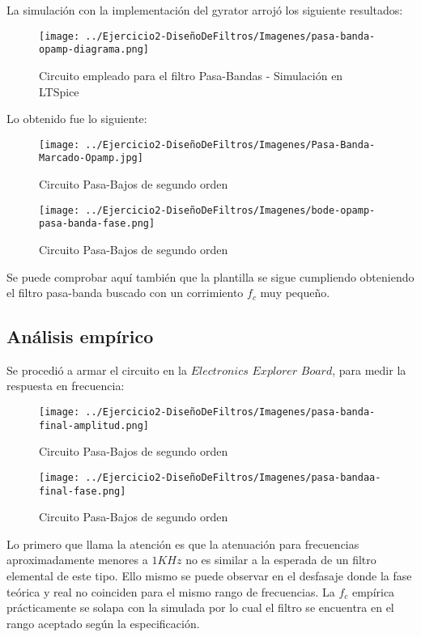 La simulación con la implementación del gyrator arrojó los siguiente resultados:

\begin{figure}[H]
    \centering
    \texttt{[image: ../Ejercicio2-DiseñoDeFiltros/Imagenes/pasa-banda-opamp-diagrama.png]}
    \caption{Circuito empleado para el filtro Pasa-Bandas - Simulación en LTSpice}
\end{figure}

Lo obtenido fue lo siguiente:

\begin{figure}[H]
    \centering
    \texttt{[image: ../Ejercicio2-DiseñoDeFiltros/Imagenes/Pasa-Banda-Marcado-Opamp.jpg]}
    \caption{Circuito Pasa-Bajos de segundo orden}
\end{figure}

\begin{figure}[H]
    \centering
    \texttt{[image: ../Ejercicio2-DiseñoDeFiltros/Imagenes/bode-opamp-pasa-banda-fase.png]}
    \caption{Circuito Pasa-Bajos de segundo orden}
\end{figure}

Se puede comprobar aquí también que la plantilla se sigue cumpliendo obteniendo el filtro pasa-banda buscado con un corrimiento
$f_c$ muy pequeño.

\subsection{Análisis empírico}

Se procedió a armar el circuito en la $Electronics$ $Explorer$ $Board$, para medir la respuesta en frecuencia:

\begin{figure}[H]
    \centering
    \texttt{[image: ../Ejercicio2-DiseñoDeFiltros/Imagenes/pasa-banda-final-amplitud.png]}
    \caption{Circuito Pasa-Bajos de segundo orden}
\end{figure}

\begin{figure}[H]
    \centering
    \texttt{[image: ../Ejercicio2-DiseñoDeFiltros/Imagenes/pasa-bandaa-final-fase.png]}
    \caption{Circuito Pasa-Bajos de segundo orden}
\end{figure}

Lo primero que llama la atención es que la atenuación para frecuencias aproximadamente menores a $1 KHz$ no es similar
a la esperada de un filtro elemental de este tipo. Ello mismo se puede observar en el desfasaje donde la fase teórica y real no coinciden para el mismo
rango de frecuencias. La $f_c$ empírica prácticamente se solapa con la simulada por lo cual el filtro se encuentra en el rango
aceptado según la especificación. 

